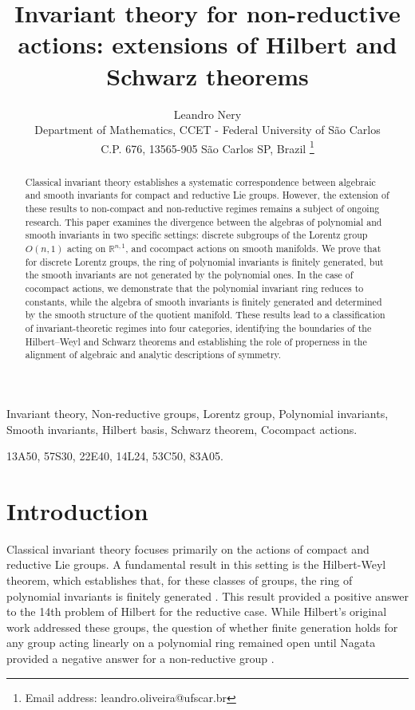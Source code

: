 \documentclass[]{article}
\title{Invariant theory for non-reductive actions: extensions of Hilbert and Schwarz theorems}
\author{Leandro Nery\\
	{\small Department of Mathematics, CCET - Federal University of S\~ao Carlos}\\
	{\small C.P. 676, 13565-905 S\~ao Carlos SP, Brazil \footnote{Email address: leandro.oliveira@ufscar.br}} }
\date{}
\begin{document}
\maketitle

\begin{abstract}
Classical invariant theory establishes a systematic correspondence between algebraic and smooth invariants for compact and reductive Lie groups. However, the extension of these results to non-compact and non-reductive regimes remains a subject of ongoing research. This paper examines the divergence between the algebras of polynomial and smooth invariants in two specific settings: discrete subgroups of the Lorentz group $O(n,1)$ acting on $\mathbb{R}^{n,1}$, and cocompact actions on smooth manifolds. We prove that for discrete Lorentz groups, the ring of polynomial invariants is finitely generated, but the smooth invariants are not generated by the polynomial ones. In the case of cocompact actions, we demonstrate that the polynomial invariant ring reduces to constants, while the algebra of smooth invariants is finitely generated and determined by the smooth structure of the quotient manifold. These results lead to a classification of invariant-theoretic regimes into four categories, identifying the boundaries of the Hilbert--Weyl and Schwarz theorems and establishing the role of properness in the alignment of algebraic and analytic descriptions of symmetry.
\end{abstract}


\bigskip

 Invariant theory, Non-reductive groups, Lorentz group, Polynomial invariants, Smooth invariants, Hilbert basis, Schwarz theorem, Cocompact actions.

\bigskip

 13A50, 57S30, 22E40, 14L24, 53C50, 83A05.
\onehalfspace

\tableofcontents

\section{Introduction}

Classical invariant theory focuses primarily on the actions of compact and reductive Lie groups. A fundamental result in this setting is the Hilbert-Weyl theorem, which establishes that, for these classes of groups, the ring of polynomial invariants is finitely generated \cite{hilbert1890,hilbert1893,weyl1946}. This result provided a positive answer to the 14th problem of Hilbert for the reductive case. While Hilbert's original work addressed these groups, the question of whether finite generation holds for any group acting linearly on a polynomial ring remained open until Nagata provided a negative answer for a non-reductive group \cite{nagata1959}.\\
\end{document}
